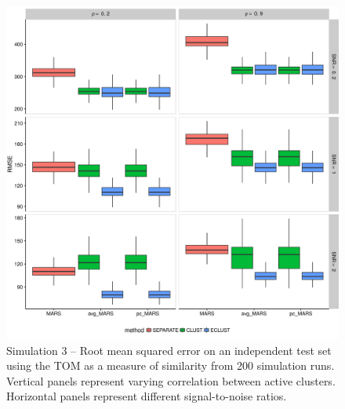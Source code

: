 \begin{figure}[H]
	\centering
	\includegraphics[scale=0.6, keepaspectratio]{./figs/hydra/results/figures/sim3-sept27/RMSE_TOM_sim3.png}
	\caption{Simulation 3 -- Root mean squared error on an independent test set using the TOM as a measure of similarity from 200 simulation runs. Vertical panels represent varying correlation between active clusters. Horizontal panels represent different signal-to-noise ratios.}
	\label{fig:RMSE_TOM_sim3}
\end{figure}

